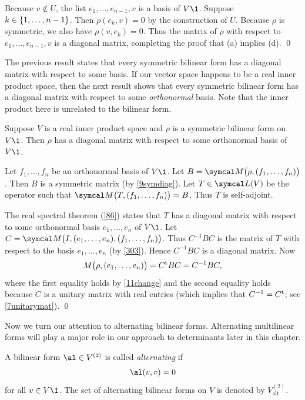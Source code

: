 Because $v \notin U$, the list $e_1, \ldots, e_{n-1}, v$ is a basis of $V\1$. Suppose $k \in \br{1, \ldots, n-1}$. Then $\rho(e_k, v) = 0$ by the construction of $U$. Because $\rho$ is symmetric, we also have $\rho(v, e_k) = 0$. Thus the matrix of $\rho$ with respect to
$e_1, \ldots, e_{n-1}, v$ is a diagonal matrix, completing the proof that (a) implies (d).
\qed

The previous result states that every symmetric bilinear form has a diagonal matrix with respect to some basis. If our vector space happens to be a real inner product space, then the next result shows that every symmetric bilinear form has a diagonal matrix with respect to some \emph{orthonormal} basis. Note that the inner product here is unrelated to the bilinear form.

{Suppose $V$ is a real inner product space and $\rho$ is a symmetric bilinear form on $V\1$. Then $\rho$ has a diagonal matrix with respect to some orthonormal basis of $V\1$.}

\proof
Let $f_1, \ldots, f_n$ be an orthonormal basis of $V\1$. Let $B = \M\paren[\big]{\rho, (f_1, \ldots, f_n) }$. Then $B$ is a symmetric matrix (by \ref{9symdiag}). Let $T \in \L(V)$ be the operator such that $\M\paren[\big]{T, (f_1, \ldots, f_n) } = B$. Thus $T$ is self-adjoint.

The real spectral theorem (\ref{86}) states that $T$ has a diagonal matrix with respect to some  orthonormal basis $e_1, \ldots, e_n$ of
$V\1$. Let $C = \M\bigl(I, (e_1, \ldots, e_n), (f_1, \ldots, f_n)\bigr)$. Thus $C^{-1} B C$ is the matrix of $T$ with respect to the basis
$e_1, \ldots, e_n$ (by \ref{303}). Hence $C^{-1} B C$ is a diagonal matrix. Now
\[
\\M\paren[\big]{ \rho, (e_1, \ldots, e_n) } = \tran{C} B C = C^{-1} B C,
\]
where the first equality holds by \ref{11change} and the second equality holds because $C$ is a unitary matrix with real entries \big(which implies that $C^{-1} = \tran{C}$; see \ref{7unitarymat}\big).
\qed

Now we turn our attention to alternating bilinear forms. Alternating multilinear forms will play a major role in our approach to determinants later in this chapter.

{A bilinear form $\al \in V^{(2)}$ is called \emph{alternating} if
\[
\al(v,v) = 0
\]
for all $v \in V\1$. The set of alternating bilinear forms on $V$ is denoted by $V^{(2)}_{\text{alt}}$.}

